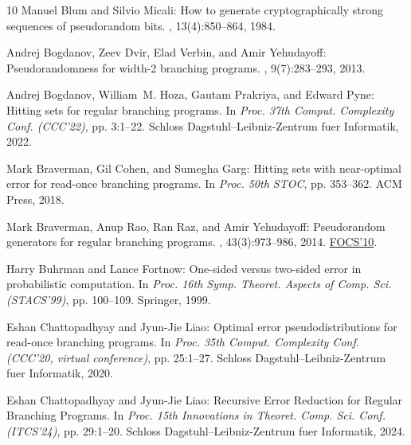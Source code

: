 \begin{thebibliography}{10}
{\sc Manuel Blum and Silvio Micali}: How to generate cryptographically strong
  sequences of pseudorandom bits.
, 13(4):850--864, 1984.
\newblock [\epfmtdoi{10.1137/0213053}]

{\sc Andrej Bogdanov, Zeev Dvir, Elad Verbin, and Amir Yehudayoff}:
  Pseudorandomness for width-2 branching programs.
, 9(7):283--293, 2013.

{\sc Andrej Bogdanov, William~M. Hoza, Gautam Prakriya, and Edward Pyne}:
  Hitting sets for regular branching programs.
\newblock In {\em Proc. 37th Comput. Complexity Conf. (CCC'22)}, pp. 3:1--22.
  Schloss Dagstuhl--Leibniz-Zentrum fuer Informatik, 2022.

{\sc Mark Braverman, Gil Cohen, and Sumegha Garg}: Hitting sets with
  near-optimal error for read-once branching programs.
\newblock In {\em Proc. 50th STOC}, pp. 353--362. ACM Press, 2018.
\newblock [\epfmtdoi{10.1145/3188745.3188780}]

{\sc Mark Braverman, Anup Rao, Ran Raz, and Amir Yehudayoff}: Pseudorandom
  generators for regular branching programs.
, 43(3):973--986, 2014.
\newblock \prelim \href{https://doi.org/10.1109/FOCS.2010.11}{FOCS'10}.
\newblock [\epfmtdoi{10.1137/120875673}]

{\sc Harry Buhrman and Lance Fortnow}: One-sided versus two-sided error in
  probabilistic computation.
\newblock In {\em Proc. 16th Symp. Theoret. Aspects of Comp. Sci. (STACS'99)},
  pp. 100--109. Springer, 1999.
\newblock [\epfmtdoi{10.1007/3-540-49116-3\_9}]

{\sc Eshan Chattopadhyay and Jyun{-}Jie Liao}: Optimal error
  pseudodistributions for read-once branching programs.
\newblock In {\em Proc. 35th Comput. Complexity Conf. (CCC'20, virtual
  conference)}, pp. 25:1--27. Schloss Dagstuhl--Leibniz-Zentrum fuer
  Informatik, 2020.

{\sc Eshan Chattopadhyay and Jyun-Jie Liao}: {Recursive Error Reduction for
  Regular Branching Programs}.
\newblock In {\em Proc. 15th Innovations in Theoret. Comp. Sci. Conf.
  (ITCS'24)}, pp. 29:1--20. Schloss Dagstuhl--Leibniz-Zentrum fuer Informatik,
  2024.


\end{thebibliography}
